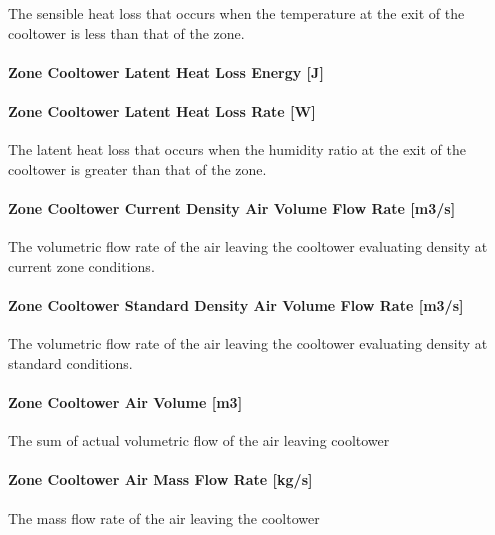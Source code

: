 The sensible heat loss that occurs when the temperature at the exit of the cooltower is less than that of the zone.

\paragraph{Zone Cooltower Latent Heat Loss Energy {[}J{]}}\label{zone-cooltower-latent-heat-loss-energy-j}

\paragraph{Zone Cooltower Latent Heat Loss Rate {[}W{]}}\label{zone-cooltower-latent-heat-loss-rate-w}

The latent heat loss that occurs when the humidity ratio at the exit of the cooltower is greater than that of the zone.

\paragraph{Zone Cooltower Current Density Air Volume Flow Rate {[}m3/s{]}}\label{zone-cooltower-air-current-density-volumetric-flow-rate-m3s}

The volumetric flow rate of the air leaving the cooltower evaluating density at current zone conditions.

\paragraph{Zone Cooltower Standard Density Air Volume Flow Rate {[}m3/s{]}}\label{zone-cooltower-air-standard-density-volumetric-flow-rate-m3s}

The volumetric flow rate of the air leaving the cooltower evaluating density at standard conditions.

\paragraph{Zone Cooltower Air Volume {[}m3{]}}\label{zone-cooltower-air-volume-m3}

The sum of actual volumetric flow of the air leaving cooltower

\paragraph{Zone Cooltower Air Mass Flow Rate {[}kg/s{]}}\label{zone-cooltower-air-mass-flow-rate-kgs}

The mass flow rate of the air leaving the cooltower

